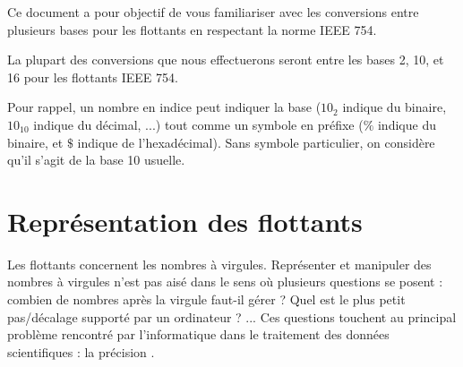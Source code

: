 \documentclass[11pt,a4paper]{article}
\begin{document}
\EncadreTitre

\bigskip


%
%

\bigskip


Ce document a pour objectif de vous familiariser avec les conversions entre plusieurs bases pour les flottants en respectant la norme IEEE 754.

\bigskip

La plupart des conversions que nous effectuerons seront entre les bases 2, 10, et 16 pour les flottants IEEE 754.

Pour rappel, un nombre en indice peut indiquer la base ($ 10_{2} $ indique du binaire, $ 10_{10} $ indique du décimal, ...) tout comme un symbole en préfixe ($ \% $ indique du binaire, et $ \$ $ indique de l'hexadécimal).
Sans symbole particulier, on considère qu'il s'agit de la base 10 usuelle.

\bigskip


\section{Représentation des flottants}

\bigskip

Les flottants concernent les nombres à virgules.
Représenter et manipuler des nombres à virgules n'est pas aisé dans le sens où plusieurs questions se posent : combien de nombres après la virgule faut-il gérer ? Quel est le plus petit pas/décalage supporté par un ordinateur ? ...
Ces questions touchent au principal problème rencontré par l'informatique dans le traitement des données scientifiques : la \og précision \fg{} .
\end{document}
